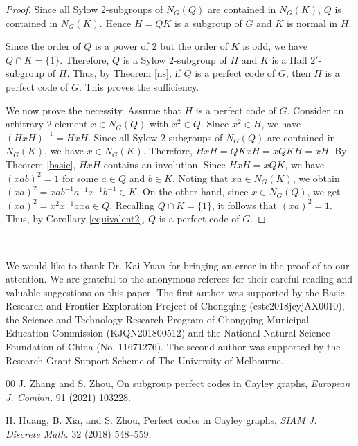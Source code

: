 \documentclass[12pt, a4paper]{article}
\theoremstyle{definition}
\begin{document}
\begin{proof}
Since all Sylow $2$-subgroups of $N_{G}(Q)$ are contained in $N_{G}(K)$, $Q$ is contained in $N_{G}(K)$. Hence $H=QK$ is a subgroup of $G$ and $K$ is normal in $H$.

Since the order of $Q$ is a power of $2$ but the order of $K$ is odd, we have $Q\cap K=\{1\}$. Therefore, $Q$ is a Sylow $2$-subgroup of $H$ and $K$ is a Hall $2'$-subgroup of $H$. Thus, by Theorem \ref{ns}, if $Q$ is a perfect code of $G$, then $H$ is a perfect code of $G$. This proves the sufficiency.

We now prove the necessity. Assume that $H$ is a perfect code of $G$. Consider an arbitrary $2$-element $x \in N_{G}(Q)$ with $x^{2}\in Q$. Since $x^{2}\in H$, we have $(HxH)^{-1}=HxH$. Since all Sylow $2$-subgroups of $N_{G}(Q)$ are contained in $N_{G}(K)$, we have $x\in N_{G}(K)$. Therefore, $HxH=QKxH=xQKH=xH$.
By Theorem \ref{basic}, $HxH$ contains an involution. Since $HxH=xQK$,
we have $(xab)^{2}=1$ for some $a\in Q$ and $b\in K$.
Noting that $xa\in N_{G}(K)$, we obtain $(xa)^{2}=xab^{-1}a^{-1}x^{-1}b^{-1}\in K$. On the other hand, since $x\in N_{G}(Q)$, we get $(xa)^{2}=x^{2}x^{-1}axa\in Q$. Recalling $Q\cap K=\{1\}$, it follows that $(xa)^{2}=1$. Thus, by Corollary \ref{equivalent2}, $Q$ is a perfect code of $G$.
\end{proof}


\smallskip

~~
\medskip

We would like to thank Dr. Kai Yuan for bringing an error in the proof of \cite[Theorem 3.1]{ZZ21} to our attention. We are grateful to the anonymous referees for their careful reading and valuable suggestions on this paper.  The first author was supported by the Basic Research and Frontier
Exploration Project of Chongqing (cstc2018jcyjAX0010), the Science and Technology Research
Program of Chongqing Municipal Education Commission (KJQN201800512) and the National Natural
Science Foundation of China (No. 11671276). The second author was supported by the Research
Grant Support Scheme of The University of Melbourne.





\begin{thebibliography}{00}
J. Zhang and S. Zhou, On subgroup perfect codes in Cayley graphs, \emph{European J. Combin.} 91 (2021) 103228.

H. Huang, B. Xia, and S. Zhou, Perfect codes in Cayley graphs, {\em SIAM J. Discrete Math.} 32 (2018) 548--559.
\end{thebibliography}
\end{document}
